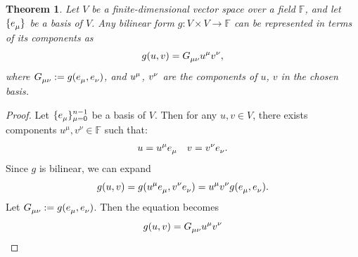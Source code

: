 \documentclass{amsart}
\newtheorem{theorem}{Theorem}[section]
\theoremstyle{definition}
\theoremstyle{remark}
\begin{document}
\begin{theorem}
  Let $V$ be a finite-dimensional vector space over a field $\mathbb{F}$, and let $\{\tensor{e}{_\mu}\}$ be a basis of $V$.  
  Any bilinear form $g: V \times V \to \mathbb{F}$ can be represented in terms of its components as
  \begin{equation*}
    g(u, v) = \tensor{G}{_\mu_\nu}\tensor{u}{^\mu}\tensor{v}{^\nu},
  \end{equation*}
  where $\tensor{G}{_\mu_\nu} := g(\tensor{e}{_\mu}, \tensor{e}{_\nu})$, and $\tensor{u}{^\mu}$, $\tensor{v}{^\nu}$ are the components of $u$, $v$ in the chosen basis.
\end{theorem}
\begin{proof}
  Let $\{\tensor{e}{_\mu}\}^{n-1}_{\mu=0}$ be a basis of $V$. Then for any $u, v\in V$, there exists components $u^\mu, v^\nu \in \mathbb{F}$ such that:
  \begin{equation*}
    u=\tensor{u}{^\mu}\tensor{e}{_\mu} \quad v = \tensor{v}{^\nu}\tensor{e}{_\nu}.
  \end{equation*}
  Since $g$ is bilinear, we can expand
  \begin{equation*}
    g(u,v) = g(\tensor{u}{^\mu}\tensor{e}{_\mu}, \tensor{v}{^\nu}\tensor{e}{_\nu})=\tensor{u}{^\mu}\tensor{v}{^\nu}g(\tensor{e}{_\mu},\tensor{e}{_\nu}).
  \end{equation*}
  Let $\tensor{G}{_\mu_\nu}:=g(\tensor{e}{_\mu}, \tensor{e}{_\nu})$. Then the equation becomes
  \begin{equation*}
    g(u, v) = \tensor{G}{_\mu_\nu}\tensor{u}{^\mu}\tensor{v}{^\nu}
  \end{equation*}
\end{proof}
\end{document}
